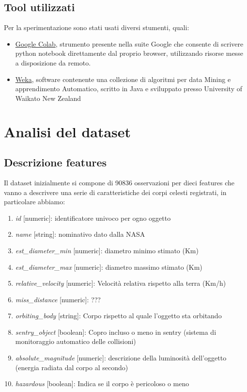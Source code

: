 \documentclass[italian,12pt,a4paper]{article}
\begin{document}
	
	\subsection{Tool utilizzati}
	Per la sperimentazione sono stati usati diversi stumenti, quali:
	
		\begin{itemize}
			\item \href{https://colab.research.google.com/}{Google Colab}, strumento  presente nella suite Google che consente di scrivere python notebook direttamente dal proprio browser, utilizzando risorse messe a disposizione da remoto. 
			\item \href{https://www.cs.waikato.ac.nz/~ml/weka/}{Weka}, software contenente una collezione di algoritmi per data Mining e apprendimento Automatico, scritto in Java e sviluppato presso University of Waikato New Zealand
			
		\end{itemize}


	\section{Analisi del dataset}
	
	\subsection{Descrizione features}
	Il dataset inizialmente si compone di 90836 osservazioni per dieci features che vanno a descrivere una serie di caratteristiche dei corpi celesti registrati, in particolare abbiamo:
	
	\begin{enumerate}
		\item \textit{id} [numeric]: identificatore univoco per ogno oggetto
		\item \textit{name} [string]: nominativo dato dalla NASA
		\item \textit{est\_diameter\_min} [numeric]: diametro minimo stimato (Km)
		\item \textit{est\_diameter\_max} [numeric]: diametro massimo stimato (Km)
		\item \textit{relative\_velocity} [numeric]: Velocità relativa rispetto alla terra (Km/h)
		\item \textit{miss\_distance }[numeric]: ???
		\item \textit{orbiting\_body} [string]: Corpo rispetto al quale l’oggetto sta orbitando
		\item \textit{sentry\_object} [boolean]: Copro incluso o meno in sentry (sistema di monitoraggio automatico delle collisioni)
		\item \textit{absolute\_magnitude} [numeric]: descrizione della luminosità dell’oggetto (energia radiata dal corpo al secondo)
		\item \textit{hazardous} [boolean]: Indica se il corpo è pericoloso o meno
	\end{enumerate}
	
\end{document}
